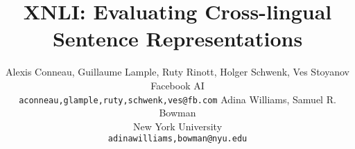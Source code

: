 \documentclass[11pt,a4paper]{article}
\title{XNLI: Evaluating Cross-lingual Sentence Representations}
\author{Alexis Conneau, Guillaume Lample, Ruty Rinott, Holger Schwenk, Ves Stoyanov  \\
  Facebook AI \\
  {\tt \normalsize aconneau,glample,ruty,schwenk,ves@fb.com} \AND
  Adina Williams, Samuel R. Bowman \\
  New York University \\
  {\tt \normalsize adinawilliams,bowman@nyu.edu} \\
  }
\date{}
\begin{document}
\maketitle



\newcommand{\insertexamples}{
    \renewcommand{\arraystretch}{1.2}
    \begin{table*}[t!]
    \small
        \resizebox{1\linewidth}{!}{
        \begin{tabular}{m{1cm}m{10.2cm}ll}
        \toprule
        Language
        & Premise / Hypothesis
        & Genre
        & Label\\
        \midrule
        English
            & \begin{tabular}[x]{@{}l@{}}
                You don't have to stay there.\\
                You can leave.
            \end{tabular}
            & Face-To-Face
            & Entailment\\
        \midrule
        French
            & \begin{tabular}[x]{@{}l@{}}
                La figure 4 montre la courbe d'offre des services de partage de travaux.\\
                Les services de partage de travaux ont une offre variable.
            \end{tabular}
            & Government
            & Entailment\\
        \midrule
        Spanish
            & \begin{tabular}[x]{@{}l@{}}
                Y se estremeció con el recuerdo.\\
                El pensamiento sobre el acontecimiento hizo su estremecimiento.
            \end{tabular}
            & Fiction
            & Entailment\\
        \midrule
        German
            & \begin{tabular}[x]{@{}l@{}}
                Während der Depression war es die ärmste Gegend, kurz vor dem Hungertod.\\
                Die Weltwirtschaftskrise dauerte mehr als zehn Jahre an.
            \end{tabular}
            & Travel
            & Neutral\\
        \midrule
        Swahili
            & \begin{tabular}[x]{@{}l@{}}
                Ni silaha ya plastiki ya moja kwa moja inayopiga risasi.\\

\end{tabular}
\end{tabular}}
\end{table*}}
\end{document}
